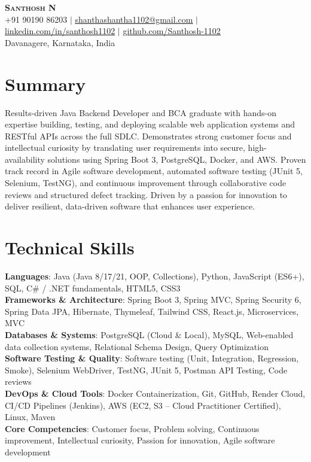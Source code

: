 \documentclass[letterpaper,10pt]{article}
\begin{document}
\begin{center}
    \textbf{\Huge \scshape Santhosh N} \\ \vspace{2pt}
    \small +91 90190 86203 $|$ \href{mailto:shanthashantha1102@gmail.com}{\underline{shanthashantha1102@gmail.com}} $|$ 
    \href{https://linkedin.com/in/santhosh1102}{\underline{linkedin.com/in/santhosh1102}} $|$
    \href{https://github.com/Santhosh-1102}{\underline{github.com/Santhosh-1102}} \\
    \small Davanagere, Karnataka, India
\end{center}

\section{Summary}
\small{
Results-driven Java Backend Developer and BCA graduate with hands-on expertise building, testing, and deploying scalable web application systems and RESTful APIs across the full SDLC. Demonstrates strong customer focus and intellectual curiosity by translating user requirements into secure, high-availability solutions using Spring Boot 3, PostgreSQL, Docker, and AWS. Proven track record in Agile software development, automated software testing (JUnit 5, Selenium, TestNG), and continuous improvement through collaborative code reviews and structured defect tracking. Driven by a passion for innovation to deliver resilient, data-driven software that enhances user experience.
}

\section{Technical Skills}
 \begin{itemize}[leftmargin=0.15in, label={}]
    \small{\item{
     \textbf{Languages}{: Java (Java 8/17/21, OOP, Collections), Python, JavaScript (ES6+), SQL, C\# / .NET fundamentals, HTML5, CSS3} \\
     \textbf{Frameworks \& Architecture}{: Spring Boot 3, Spring MVC, Spring Security 6, Spring Data JPA, Hibernate, Thymeleaf, Tailwind CSS, React.js, Microservices, MVC} \\
     \textbf{Databases \& Systems}{: PostgreSQL (Cloud \& Local), MySQL, Web-enabled data collection systems, Relational Schema Design, Query Optimization} \\
     \textbf{Software Testing \& Quality}{: Software testing (Unit, Integration, Regression, Smoke), Selenium WebDriver, TestNG, JUnit 5, Postman API Testing, Code reviews} \\
     \textbf{DevOps \& Cloud Tools}{: Docker Containerization, Git, GitHub, Render Cloud, CI/CD Pipelines (Jenkins), AWS (EC2, S3 – Cloud Practitioner Certified), Linux, Maven} \\
     \textbf{Core Competencies}{: Customer focus, Problem solving, Continuous improvement, Intellectual curiosity, Passion for innovation, Agile software development}
    }}
 \end{itemize}
\end{document}
